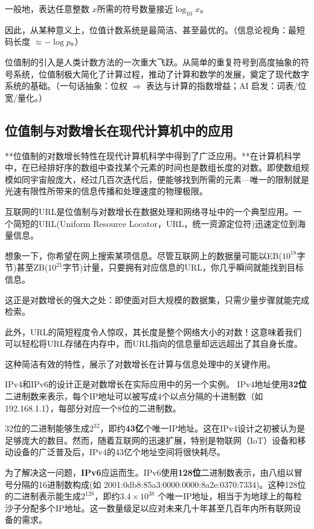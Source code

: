 一般地，表达任意整数 $x$所需的符号数量接近${\log_{10} x}$。

因此，从某种意义上，位值计数系统是最简洁、甚至最优的。{（信息论视角：最短码长度 $\approx -\log p$。）}

位值制的引入是人类计数方法的一次重大飞跃。从简单的重复符号到高度抽象的符号系统，位值制极大简化了计算过程，推动了计算和数学的发展，奠定了现代数字系统的基础。{（一句话抽象：位权 $\Rightarrow$ 表达与计算的指数增益；AI 启发：词表/位宽/量化。）}

\subsection{位值制与对数增长在现代计算机中的应用}


**位值制的对数增长特性在现代计算机科学中得到了广泛应用。**在计算机科学中，在已经排好序的数组中查找某个元素的时间也是数组长度的对数。即使数组规模如同宇宙般庞大，经过几百次迭代后，便能够找到所需的元素---唯一的限制就是光速有限性所带来的信息传播和处理速度的物理极限。

互联网的URL是位值制与对数增长在数据处理和网络寻址中的一个典型应用。一个简短的URL(Uniform Resource Locator，URL，统一资源定位符)迅速定位到海量信息。

想象一下，你希望在网上搜索某项信息。尽管互联网上的数据量可能以EB($10^{18}$字节)甚至ZB($10^{21}$字节)计量，只要拥有对应信息的URL，你几乎瞬间就能找到目标信息。

这正是对数增长的强大之处：即使面对巨大规模的数据集，只需少量步骤就能完成检索。

此外，URL的简短程度令人惊叹，其长度是整个网络大小的对数！这意味着我们可以轻松将URL存储在内存中，而URL指向的信息量却远远超出了其自身长度。

这种简洁有效的特性，展示了对数增长在计算与信息处理中的关键作用。

IPv4和IPv6的设计正是对数增长在实际应用中的另一个实例。
 IPv4地址使用{\bf 32位}二进制数来表示，每个IP地址可以被写成4个以点分隔的十进制数（如192.168.1.1），每部分对应一个8位的二进制数。


32位的二进制能够生成$2^{32}$，即约{\bf 43亿}个唯一IP地址。这在IPv4设计之初被认为是足够庞大的数目。然而，随着互联网的迅速扩展，特别是物联网（IoT）设备和移动设备的广泛普及后，IPv4的43亿个地址空间将很快耗尽。

   为了解决这一问题，{\bf IPv6}应运而生。IPv6使用{\bf 128位}二进制数表示，由八组以冒号分隔的16进制数构成(如 2001:0db8:85a3:0000:0000:8a2e:0370:7334)。这种128位的二进制表示能生成$2^{128}$，即约{\bf $3.4 \times 10^{38} $} 个唯一IP地址，相当于为地球上的每粒沙子分配多个IP地址。这一数量级足以应对未来几十年甚至几百年内所有联网设备的需求。

